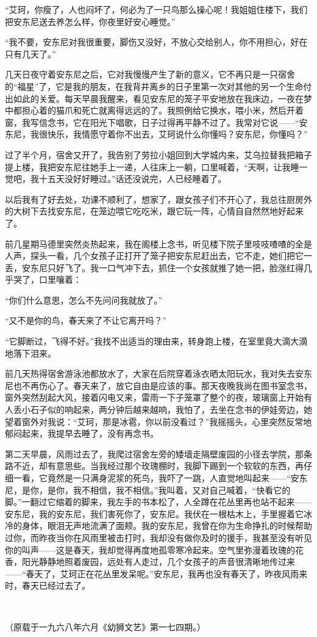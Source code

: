 \par “艾珂，你瘦了，人也闷坏了，何必为了一只鸟那么操心呢！我姐姐住楼下，我们把安东尼送去养怎么样，你夜里好安心睡觉。”
\par “我不要，安东尼对我很重要，脚伤又没好，不放心交给别人，你不用担心，好在只有几天了。”
\par 几天日夜守着安东尼之后，它对我慢慢产生了新的意义，它不再只是一只宿舍的“福星”了，它是我的朋友，在我背井离乡的日子里第一次对其他的另一个生命付出如此的关爱。每天早晨我醒来，看见安东尼的笼子平安地放在我床边，一夜在梦中都担心着的猫爪和死亡就离得远远的了。我照例给它换水，喂小米，然后开着窗，我写信念书，它在阳光下唱歌，日子过得再平静不过了。我常对它说——“安东尼，我很快乐，我情愿守着你不出去，艾珂说什么你懂吗？安东尼，你懂吗？”
\par 过了半个月，宿舍又开了，我告别了劳拉小姐回到大学城内来，艾乌拉替我把箱子提上楼，我把安东尼往她手上一递，人往床上一躺，口里喊着，“天啊，让我睡一觉吧，我十五天没好好睡过。”话还没说完，人已经睡着了。
\par 以后我有了好去处，功课不顺利了，想家了，跟女孩子们不开心了，我总往厨房外的大树下去找安东尼，在笼边喂它吃吃米，跟它玩一阵，心情自自然然地好起来了。
\par 前几星期马德里突然炎热起来，我在阁楼上念书，听见楼下院子里吱吱喳喳的全是人声，探头一看，几个女孩子正打开了笼子把安东尼赶出去，它不走，她们把它一丢，安东尼只好飞了。我一口气冲下去，抓住一个女孩就推了她一把，脸涨红得几乎哭了，口里嚷着：
\par “你们什么意思，怎么不先问问我就放了。”
\par “又不是你的鸟，春天来了不让它离开吗？”
\par “它脚断过，飞得不好。”我找不出适当的理由来，转身跑上楼，在室里竟大滴大滴地落下泪来。
\par 前几天热得宿舍游泳池都放水了，大家在后院穿着泳衣晒太阳玩水，我对失去安东尼也不再伤心了。春天来了，放它自由是应该的事。那天夜晚我尚在图书室念书，窗外突然刮起大风，接着闪电又来，雷雨一下子笼罩了整个的夜，玻璃窗上开始有人丢小石子似的响起来，两分钟后越来越响，我怕了，去坐在念书的伊娃旁边，她望着窗外对我说：“艾珂，那是冰雹，你以前没看过？”我摇摇头，心里突然反常地郁闷起来，我提早去睡了，没有再念书。
\par 第二天早晨，风雨过去了，我爬过宿舍左旁的矮墙走隔壁废园的小径去学院，那条路不近，却有意思些。当我经过那个玫瑰棚时，我脚下踢到一个软软的东西，再仔细一看，它竟然是一只满身泥浆的死鸟，我吓了一跳，人直觉地叫起来——“安东尼，是你，是你，我不相信，我不相信。”我叫着，又对自己喊着，“快看它的脚。”一翻过它缩着的脚来，我左手的书本松了，人全蹲在花丛里再也站不起来——安东尼，我的安东尼，我们害死你了，安东尼。我伏在一根枯木上，手里握着它冰冷的身体，眼泪无声地流满了面颊。我的安东尼，我曾在你为生命挣扎的时候帮助过你，而昨夜当你在风雨里被击打时，我却没有做你及时的援手，我甚至没有听见你的叫声——这是春天，我却觉得再度地孤零寒冷起来。空气里弥漫着玫瑰的花香，阳光静静地照着废园，远处有人走过，几个女孩子的声音很清晰地传过来——“春天了，艾珂正在花丛里发呆呢。”安东尼，我再也没有春天了，昨夜风雨来时，春天已经过去了。
\par  
\par （原载于一九六八年六月《幼狮文艺》第一七四期。）




